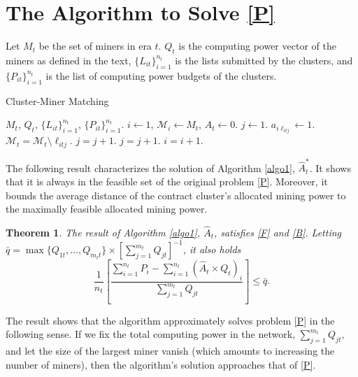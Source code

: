 \documentclass[11pt, a4paper, twocolumn]{article}
\newtheorem{theorem}{Theorem}
\begin{document}
\appendix
\section{The Algorithm to Solve \eqref{P}}\label{app:algo}
Let $M_t$ be the set of miners in era $t$. $Q_t$ is the computing power vector of the miners as defined in the text, $\{L_{it}\}_{i=1}^{n_t}$ is the lists submitted by the clusters, and $\{P_{it}\}_{i=1}^{n_t}$ is the list of computing power budgets of the clusters.
 
\begin{algorithm}[h!]
	\caption{Cluster-Miner Matching}
	\label{algo1}
	\begin{algorithmic}[1]
		\REQUIRE $M_t$, $Q_t$, $\{L_{it}\}_{i=1}^{n_t}$, $\{P_{it}\}_{i=1}^{n_t}$.
		\STATE $i \leftarrow 1$, $\mathcal M_i \leftarrow M_t$, $A_t \leftarrow 0$.
		\STATE $j \leftarrow 1$.
			\STATE $a_{i\ell_{itj}} \leftarrow 1$.
			\STATE $\mathcal M_t = \mathcal M_t \setminus \ell_{itj}$.
			\STATE $j = j+1$.
		\ELSE
		\ENDIF
		\ELSE
		\STATE $j = j+1$.
		\ENDIF
		\ENDWHILE
		\STATE $i=i+1$.
		\ENDFOR
	\end{algorithmic}
\end{algorithm}

The following result characterizes the solution of Algorithm \ref{algo1}, $\hat A_t^*$. It shows that it is always in the feasible set of the original problem \ref{P}. Moreover, it bounds the average distance of the contract cluster's allocated mining power to the maximally feasible allocated mining power. 

\begin{theorem}\label{t1} The result of Algorithm \ref{algo1}, $\hat A_t$, satisfies \eqref{F} and \eqref{B}. Letting $\bar q = \max \{Q_{1t},...,Q_{m_tt}\}\times\left[\sum_{j=1}^{m_t} Q_{jt}\right]^{-1}$, it also holds $$\frac{1}{n_t}\left[\frac{\sum_{i=1}^{n_t} P_i-\sum_{i=1}^{n_t}(\hat A_t \times Q_t)_i}{ \sum_{j=1}^{m_t}Q_{jt}}\right] \leq \bar q.$$
\end{theorem}

The result shows that the algorithm approximately solves problem \eqref{P} in the following sense. If we fix the total computing power in the network, $\sum_{j=1}^{m_t}Q_{jt}$, and let the size of the largest miner vanish (which amounts to increasing the number of miners), then the algorithm's solution approaches that of \eqref{P}.
\end{document}
